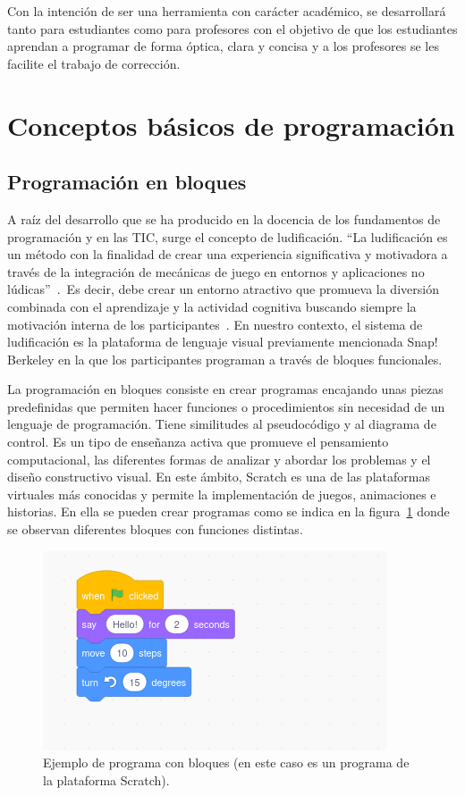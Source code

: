 \documentclass[a4paper, 12pt]{book}
\begin{document}
Con la intención de ser una herramienta con carácter académico, se desarrollará tanto para estudiantes como para profesores con el objetivo de que los estudiantes aprendan a programar de forma óptica, clara y concisa y a los profesores se les facilite el trabajo de corrección.

\section{Conceptos básicos de programación}

\subsection{Programación en bloques}
A raíz del desarrollo que se ha producido en la docencia de los fundamentos de programación y en las TIC, surge el concepto de ludificación. ``La ludificación es un método con la finalidad de crear una experiencia significativa y motivadora a través de la integración de mecánicas de juego en entornos y aplicaciones no lúdicas''~\cite{lopez2017pensamiento}.~Es decir, debe crear un entorno atractivo que promueva la diversión combinada con el aprendizaje y la actividad cognitiva buscando siempre la motivación interna de los participantes~\cite{vsimko2014ludificacion}. En nuestro contexto, el sistema de ludificación es la plataforma de lenguaje visual previamente mencionada Snap! Berkeley en la que los participantes programan a través de bloques funcionales.

La programación en bloques consiste en crear programas encajando unas piezas predefinidas que permiten hacer funciones o procedimientos sin necesidad de un lenguaje de programación. Tiene similitudes al pseudocódigo y al diagrama de control. Es un tipo de enseñanza activa que promueve el pensamiento computacional, las diferentes formas de analizar y abordar los problemas y el diseño constructivo visual.
En este ámbito, Scratch es una de las plataformas virtuales más conocidas y permite la implementación de juegos, animaciones e historias. En ella se pueden crear programas como se indica en la figura~\ref{figura:scratch} donde se observan diferentes bloques con funciones distintas.
\begin{figure}[h]
        \centering
        \includegraphics[scale=0.55]{img/scratch.png}
        \caption{Ejemplo de programa con bloques (en este caso es un programa de la plataforma Scratch).}
        \label{figura:scratch}
\end{figure}
\end{document}
